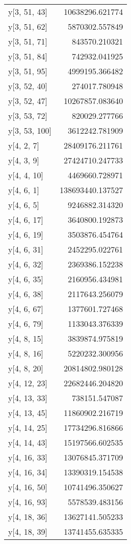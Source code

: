\begin{longtable}{lr}
y[3, 51, 43] & 10638296.621774 \\
y[3, 51, 62] & 5870302.557849 \\
y[3, 51, 71] & 843570.210321 \\
y[3, 51, 84] & 742932.041925 \\
y[3, 51, 95] & 4999195.366482 \\
y[3, 52, 40] & 274017.780948 \\
y[3, 52, 47] & 10267857.083640 \\
y[3, 53, 72] & 820029.277766 \\
y[3, 53, 100] & 3612242.781909 \\
y[4, 2, 7] & 28409176.211761 \\
y[4, 3, 9] & 27424710.247733 \\
y[4, 4, 10] & 4469660.728971 \\
y[4, 6, 1] & 138693440.137527 \\
y[4, 6, 5] & 9246882.314320 \\
y[4, 6, 17] & 3640800.192873 \\
y[4, 6, 19] & 3503876.454764 \\
y[4, 6, 31] & 2452295.022761 \\
y[4, 6, 32] & 2369386.152238 \\
y[4, 6, 35] & 2160956.434981 \\
y[4, 6, 38] & 2117643.256079 \\
y[4, 6, 67] & 1377601.727468 \\
y[4, 6, 79] & 1133043.376339 \\
y[4, 8, 15] & 3839874.975819 \\
y[4, 8, 16] & 5220232.300956 \\
y[4, 8, 20] & 20814802.980128 \\
y[4, 12, 23] & 22682446.204820 \\
y[4, 13, 33] & 738151.547087 \\
y[4, 13, 45] & 11860902.216719 \\
y[4, 14, 25] & 17734296.816866 \\
y[4, 14, 43] & 15197566.602535 \\
y[4, 16, 33] & 13076845.371709 \\
y[4, 16, 34] & 13390319.154538 \\
y[4, 16, 50] & 10741496.350627 \\
y[4, 16, 93] & 5578539.483156 \\
y[4, 18, 36] & 13627141.505233 \\
y[4, 18, 39] & 13741455.635335 \\

\end{longtable}
